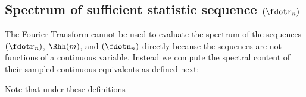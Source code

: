 \subsection{Spectrum of sufficient statistic sequence $(\fdotr_n)$}
The Fourier Transform cannot be used to evaluate the spectrum of the
sequences $(\fdotr_n)$, $\Rhh(m)$, and $(\fdotn_n)$ directly
because the sequences are not functions of a continuous variable.
Instead we compute the spectral content of their sampled
continuous equivalents as defined next:

Note that under these definitions




